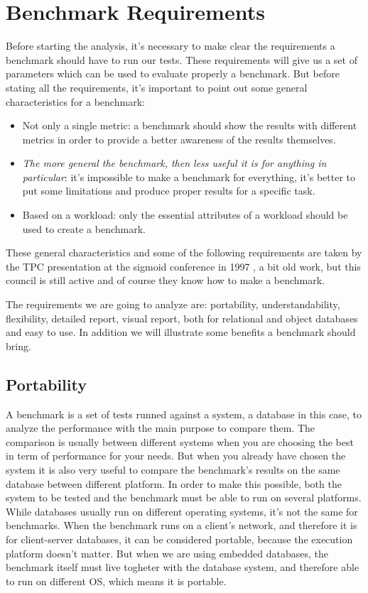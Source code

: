 	\section{Benchmark Requirements} \label{requirements}
Before starting the analysis, it's necessary to make clear the requirements a benchmark should have to run our tests. These requirements will give us a set of parameters which can be used to evaluate properly a benchmark. But before stating all the requirements, it's important to point out some general characteristics for a benchmark:
\begin{itemize}
	\item Not only a single metric: a benchmark should show the results with different metrics in order to provide a better awareness of the results themselves.
	\item \emph{The more general the benchmark, then less useful it is for anything in particular}: it's impossible to make a benchmark for everything, it's better to put some limitations and produce proper results for a specific task.
	\item Based on a workload: only the essential attributes of a workload should be used to create a benchmark.
\end{itemize}
  
These general characteristics and some of the following requirements are taken by the TPC presentation at the sigmoid conference in 1997 \cite{tpc/sigmoid}, a bit old work, but this council is still active and of course they know how to make a benchmark.

The requirements we are going to analyze are: portability, understandability, flexibility, detailed report, visual report, both for relational and object databases and easy to use. In addition we will illustrate some benefits a benchmark should bring. 

		\subsection{Portability}
A benchmark is a set of tests runned against a system, a database in this case, to analyze the performance with the main purpose to compare them. The comparison is usually between different systems when you are choosing the best in term of performance for your needs. But when you already have chosen the system it is also very useful to compare the benchmark's results on the same database between different platform. In order to make this possible, both the system to be tested and the benchmark must be able to run on several platforms. While databases usually run on different operating systems, it's not the same for benchmarks. When the benchmark runs on a client's network, and therefore it is for client-server databases, it can be considered portable, because the execution platform doesn't matter. But when we are using embedded databases, the benchmark itself must live togheter with the database system, and therefore able to run on different OS, which means it is portable.


